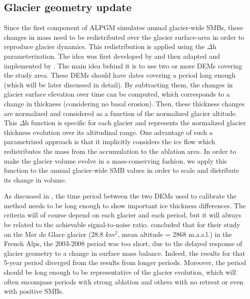 \subsection{Glacier geometry update} \label{methods:methods:deltah}

Since the first component of ALPGM simulates annual glacier-wide SMBs, these changes in mass need to be redistributed over the glacier surface-area in order to reproduce glacier dynamics. This redistribution is applied using the $\Delta$h parameterization. The idea was first developed by \citet{johannesson_timescale_1989} and then adapted and implemented by \citet{huss_modelling_2008}. The main idea behind it is to use two or more DEMs covering the study area. These DEMs should have dates covering a period long enough (which will be later discussed in detail). By subtracting them, the changes in glacier surface elevation over time can be computed, which corresponds to a change in thickness (considering no basal erosion). Then, these thickness changes are normalized and considered as a function of the normalized glacier altitude. This $\Delta$h function is specific for each glacier and represents the normalized glacier thickness evolution over its altitudinal range. One advantage of such a parametrized approach is that it implicitly considers the ice flow which redistributes the mass from the accumulation to the ablation area. In order to make the glacier volume evolve in a mass-conserving fashion, we apply this function to the annual glacier-wide SMB values in order to scale and distribute its change in volume. 

As discussed in \citet{vincent_future_2014}, the time period between the two DEMs used to calibrate the method needs to be long enough to show important ice thickness differences. The criteria will of course depend on each glacier and each period, but it will always be related to the achievable signal-to-noise ratio. \citet{vincent_future_2014} concluded that for their study on the Mer de Glace glacier (28.8 \(km^2\), mean altitude = 2868 m.a.s.l.) in the French Alps, the 2003-2008 period was too short, due to the delayed response of glacier geometry to a change in surface mass balance. Indeed, the results for that 5-year period diverged from the results from longer periods. Moreover, the period should be long enough to be representative of the glacier evolution, which will often encompass periods with strong ablation and others with no retreat or even with positive SMBs. 

